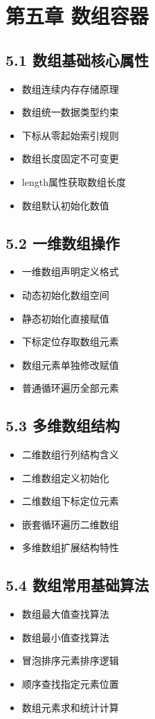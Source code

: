 \section{第五章 数组容器}
\subsection{5.1 数组基础核心属性}
\begin{itemize}
\item 数组连续内存存储原理
\item 数组统一数据类型约束
\item 下标从零起始索引规则
\item 数组长度固定不可变更
\item length属性获取数组长度
\item 数组默认初始化数值
\end{itemize}

\subsection{5.2 一维数组操作}
\begin{itemize}
\item 一维数组声明定义格式
\item 动态初始化数组空间
\item 静态初始化直接赋值
\item 下标定位存取数组元素
\item 数组元素单独修改赋值
\item 普通循环遍历全部元素
\end{itemize}

\subsection{5.3 多维数组结构}
\begin{itemize}
\item 二维数组行列结构含义
\item 二维数组定义初始化
\item 二维数组下标定位元素
\item 嵌套循环遍历二维数组
\item 多维数组扩展结构特性
\end{itemize}

\subsection{5.4 数组常用基础算法}
\begin{itemize}
\item 数组最大值查找算法
\item 数组最小值查找算法
\item 冒泡排序元素排序逻辑
\item 顺序查找指定元素位置
\item 数组元素求和统计计算
\end{itemize}

